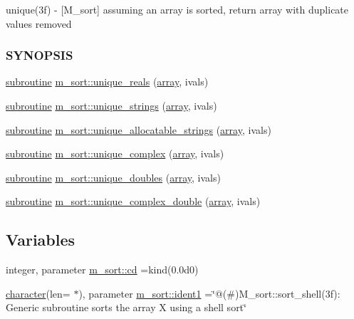 \begin{DoxyCompactItemize}
\begin{DoxyCompactList}
unique(3f) -\/ \mbox{[}M\+\_\+sort\mbox{]} assuming an array is sorted, return array with duplicate values removed \subsubsection*{S\+Y\+N\+O\+P\+S\+IS}\end{DoxyCompactList}\item 
\hyperlink{M__stopwatch_83_8txt_acfbcff50169d691ff02d4a123ed70482}{subroutine} \hyperlink{namespacem__sort_a470fbc1195b0760c61e002bfa5bfc66b}{m\+\_\+sort\+::unique\+\_\+reals} (\hyperlink{intro__blas1_83_8txt_a89db1945e1a335ab0184c6a097821e32}{array}, ivals)
\item 
\hyperlink{M__stopwatch_83_8txt_acfbcff50169d691ff02d4a123ed70482}{subroutine} \hyperlink{namespacem__sort_a98d8fb88ae5d8af163ca3bfebfb0b6ce}{m\+\_\+sort\+::unique\+\_\+strings} (\hyperlink{intro__blas1_83_8txt_a89db1945e1a335ab0184c6a097821e32}{array}, ivals)
\item 
\hyperlink{M__stopwatch_83_8txt_acfbcff50169d691ff02d4a123ed70482}{subroutine} \hyperlink{namespacem__sort_aa22f908e4cfd3de7d4183ee6d7747059}{m\+\_\+sort\+::unique\+\_\+allocatable\+\_\+strings} (\hyperlink{intro__blas1_83_8txt_a89db1945e1a335ab0184c6a097821e32}{array}, ivals)
\item 
\hyperlink{M__stopwatch_83_8txt_acfbcff50169d691ff02d4a123ed70482}{subroutine} \hyperlink{namespacem__sort_a18c09fe412398c160d2c9faf04ae148a}{m\+\_\+sort\+::unique\+\_\+complex} (\hyperlink{intro__blas1_83_8txt_a89db1945e1a335ab0184c6a097821e32}{array}, ivals)
\item 
\hyperlink{M__stopwatch_83_8txt_acfbcff50169d691ff02d4a123ed70482}{subroutine} \hyperlink{namespacem__sort_aff9053163d3ee6b765565274d26bf95a}{m\+\_\+sort\+::unique\+\_\+doubles} (\hyperlink{intro__blas1_83_8txt_a89db1945e1a335ab0184c6a097821e32}{array}, ivals)
\item 
\hyperlink{M__stopwatch_83_8txt_acfbcff50169d691ff02d4a123ed70482}{subroutine} \hyperlink{namespacem__sort_ad37e76fb471bb1beb20dc474cbfed7c4}{m\+\_\+sort\+::unique\+\_\+complex\+\_\+double} (\hyperlink{intro__blas1_83_8txt_a89db1945e1a335ab0184c6a097821e32}{array}, ivals)
\end{DoxyCompactItemize}
\subsection*{Variables}
\begin{DoxyCompactItemize}
\item 
integer, parameter \hyperlink{namespacem__sort_a2e8760d2fbf02c41be1e16f82c9f58e2}{m\+\_\+sort\+::cd} =kind(0.\+0d0)
\item 
\hyperlink{option__stopwatch_83_8txt_abd4b21fbbd175834027b5224bfe97e66}{character}(len= $\ast$), parameter \hyperlink{namespacem__sort_a9f2489cd2b898bf6e1d3a78bfb08ef06}{m\+\_\+sort\+::ident1} =\char`\"{}@(\#)M\+\_\+sort\+::sort\+\_\+shell(3f)\+: Generic subroutine sorts the array X using a shell sort\char`\"{}
\end{DoxyCompactItemize}


